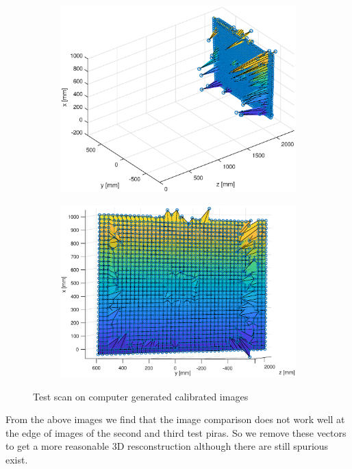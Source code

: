 \begin{figure}[h!]
\begin{subfigure}[t]{0.20\linewidth}
		\includegraphics[width=1\linewidth]{figures/part2/test3_scan}
	\end{subfigure}
	\begin{subfigure}[t]{0.20\linewidth}
		\centering
		\includegraphics[width=1\linewidth]{figures/part2/test3_scan1}
	\end{subfigure}
	\caption{Test scan on computer generated calibrated images}
	\label{fig:test_scan}
 
\end{figure}


From the above images we find that the image comparison does not work well at the edge of images of the second and third test piras. So we remove these vectors to get a more reasonable 3D resconstruction although there are still spurious exist. 

